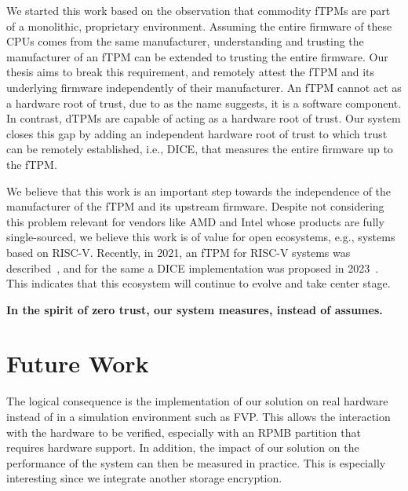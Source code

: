 We started this work based on the observation that commodity \acp{fTPM} are part of a monolithic, proprietary environment.
Assuming the entire firmware of these CPUs comes from the same manufacturer, understanding and trusting the manufacturer of an \ac{fTPM} can be extended to trusting the entire firmware.
Our thesis aims to break this requirement, and remotely attest the \ac{fTPM} and its underlying firmware independently of their manufacturer.
An \ac{fTPM} cannot act as a hardware root of trust, due to as the name suggests, it is a software component.
In contrast, \acp{dTPM} are capable of acting as a hardware root of trust.
Our system closes this gap by adding an independent hardware root of trust to which trust can be remotely established, i.e., \ac{DICE}, that measures the entire firmware up to the \ac{fTPM}.



We believe that this work is an important step towards the independence of the manufacturer of the \ac{fTPM} and its upstream firmware. %
Despite not considering this problem relevant for vendors like AMD and Intel whose products are fully single-sourced, we believe this work is of value for open ecosystems, e.g., systems based on RISC-V\@.
Recently, in 2021, an \ac{fTPM} for RISC-V systems was described~\cite{Boubakri2021}, and for the same a \ac{DICE} implementation was proposed in 2023~\cite{Bravi2023}.
This indicates that this ecosystem will continue to evolve and take center stage.

\textbf{In the spirit of zero trust, our system measures, instead of assumes.}

\section{Future Work}

The logical consequence is the implementation of our solution on real hardware instead of in a simulation environment such as FVP\@.
This allows the interaction with the hardware to be verified, especially with an RPMB partition that requires hardware support.
In addition, the impact of our solution on the performance of the system can then be measured in practice.
This is especially interesting since we integrate another storage encryption.

